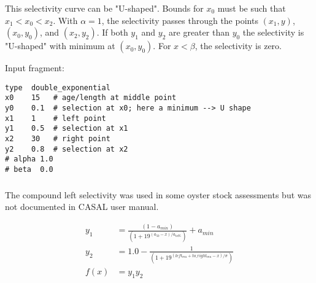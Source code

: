 This selectivity curve can be "U-shaped". Bounds for $x_0$ must be such that $x_1 < x_0 < x_2$. With $\alpha=1$, the selectivity passes through the points $(x_1, y)$, $(x_0, y_0)$, and $(x_2, y_2)$. If both $y_1$ and $y_2$ are greater than $y_0$ the selectivity is "U-shaped" with minimum at $(x_0, y_0)$.  For $x < \beta$, the selectivity is zero.

Input fragment: {\small{\begin{verbatim}
type  double_exponential
x0    15   # age/length at middle point
y0    0.1  # selection at x0; here a minimum --> U shape
x1    1    # left point
y1    0.5  # selection at x1
x2    30   # right point
y2    0.8  # selection at x2
# alpha 1.0
# beta  0.0
\end{verbatim}}}

%
%

\subsubsection[Compound-Left]{}\label{sec:Selectivity-CompoundLeft}

The compound left selectivity was used in some oyster stock assessments but was not documented in CASAL user manual.

\begin{align*}
y_1 & = \frac{\left(1 - a_{min}\right)}{\left(1 + 19^{(a_{50} - x)/a_{to95}}\right)}  + a_{min}\\
y_2 & = 1.0 - \frac{1}{\left(1 + 19^{(left_{mu} + to\_right_{mu} - x)/\sigma}\right)}\\
f(x)  &= 	y_1 y_2
\end{align*}


\subsubsection[Compound-Right]{}\label{sec:Selectivity-CompoundRight}

